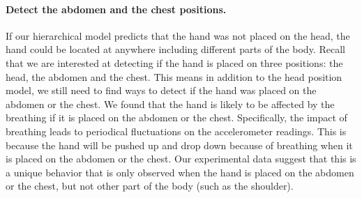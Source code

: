 
\paragraph{Detect the abdomen and the chest positions.}

If our hierarchical model predicts that the hand was not placed on the head, the hand could be located at anywhere including different
parts of the body. Recall that we are interested at detecting if the hand is placed on three positions: the head, the abdomen and the
chest. This means in addition to the head position model, we still need to find ways to detect if the hand was placed on the abdomen or the
chest. We found that the hand is likely to be affected by the breathing if it is placed on the abdomen or the chest. Specifically, the
 impact of breathing leads to periodical fluctuations on the accelerometer readings. This is because the hand will be pushed up and drop down because of
breathing when it is placed on the abdomen or the chest. Our experimental data suggest that this is a unique behavior that is only observed
when the hand is placed on the abdomen or the chest, but not other part of the body (such as the shoulder).


